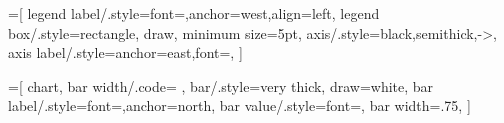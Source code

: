 \usepackage{calc}
\usepackage{ifthen}

\newcommand{\slice}[4]{
  \pgfmathparse{0.5*#1+0.5*#2}
  \let\midangle\pgfmathresult

  \draw[thick,fill=black!10] (0,0) -- (#1:1) arc (#1:#2:1) -- cycle;

  \node[label=\midangle:#4] at (\midangle:1) {};

  \pgfmathparse{min((#2-#1-10)/110*(-0.3),0)}
  \let\temp\pgfmathresult
  \pgfmathparse{max(\temp,-0.5) + 0.8}
  \let\innerpos\pgfmathresult
  \node at (\midangle:\innerpos) {#3};
}




\usepackage{tocbibind} %

\usepackage{scrextend} 


\usepackage{enumitem}

\usepackage{gensymb} %

\usepackage{arydshln} %

\usepackage[version=3]{mhchem} %


\usepackage{eurosym}
\usepackage{lmodern}
\usepackage{newpxmath}
\usepackage[scaled=0.95]{inconsolata}



\makeatletter

=[
    legend label/.style={font={\scriptsize},anchor=west,align=left},
    legend box/.style={rectangle, draw, minimum size=5pt},
    axis/.style={black,semithick,->},
    axis label/.style={anchor=east,font={\tiny}},
]

=[
    chart,
    bar width/.code={
        \global\let\bar@w\pgfmathresult
    },
    bar/.style={very thick, draw=white},
    bar label/.style={font={\bf\small},anchor=north},
    bar value/.style={font={\footnotesize}},
    bar width=.75,
]

